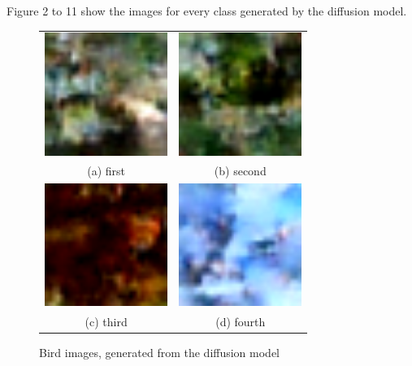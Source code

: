 \documentclass[conference]{IEEEtran}
\begin{document}

Figure 2 to 11 show the images for every class generated by the diffusion model.
\begin{figure}
  \begin{tabular}{cc}
    \includegraphics[width=40mm]{./images/generated-imgs-cosine/bird/0204.png} 
&   \includegraphics[width=40mm]{./images/generated-imgs-cosine/bird/0205.png} 
\\
  (a) first 
  & (b) second \\[6pt]
     \includegraphics[width=40mm]{./images/generated-imgs-cosine/bird/0206.png} 
  &  \includegraphics[width=40mm]{./images/generated-imgs-cosine/bird/0207.png} 
\\
  (c) third & (d) fourth \\[6pt]
  \end{tabular}
  \caption{Bird images, generated from the diffusion model}
  \end{figure}
\end{document}
